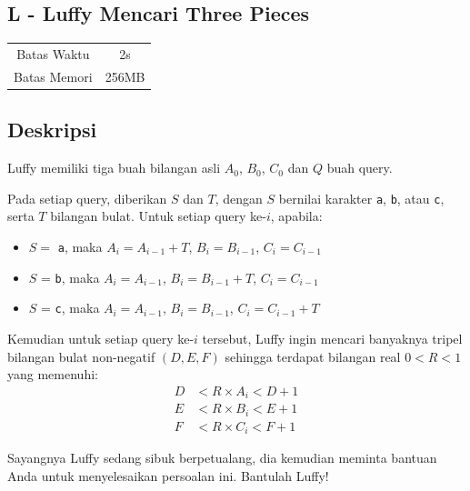 \documentclass{article}
\begin{document}
\begin{center}
    \section*{L - Luffy Mencari Three Pieces} %

    \begin{tabular}{ | c c | }
        \hline
        Batas Waktu  & 2s \\    %
        Batas Memori & 256MB \\  %
        \hline
    \end{tabular}
\end{center}

\subsection*{Deskripsi}

Luffy memiliki tiga buah bilangan asli $A_0$, $B_0$, $C_0$ dan $Q$ buah query.

Pada setiap query, diberikan $S$ dan $T$, dengan $S$ bernilai karakter \lstinline|a|, \lstinline|b|, atau \lstinline|c|, serta $T$ bilangan bulat. Untuk setiap query ke-$i$, apabila:

\begin{itemize}

\item $S =$ \lstinline|a|, maka $A_i = A_{i - 1} + T$, $B_i = B_{i - 1}$, $C_i = C_{i - 1}$

\item $S$ = \lstinline|b|, maka $A_i = A_{i - 1}$, $B_i = B_{i - 1} + T$, $C_i = C_{i - 1}$

\item $S$ = \lstinline|c|, maka $A_i = A_{i - 1}$, $B_i = B_{i - 1}$, $C_i = C_{i - 1} + T$

\end{itemize}

Kemudian untuk setiap query ke-$i$ tersebut, Luffy ingin mencari banyaknya tripel bilangan bulat non-negatif $\left(D, E, F\right)$ sehingga terdapat bilangan real $0 < R < 1$ yang memenuhi:
\begin{align*}
D &< R \times A_i < D + 1 \\
E &< R \times B_i < E + 1 \\
F &< R \times C_i < F + 1
\end{align*}

Sayangnya Luffy sedang sibuk berpetualang, dia kemudian meminta bantuan Anda untuk menyelesaikan persoalan ini. Bantulah Luffy!
\end{document}
